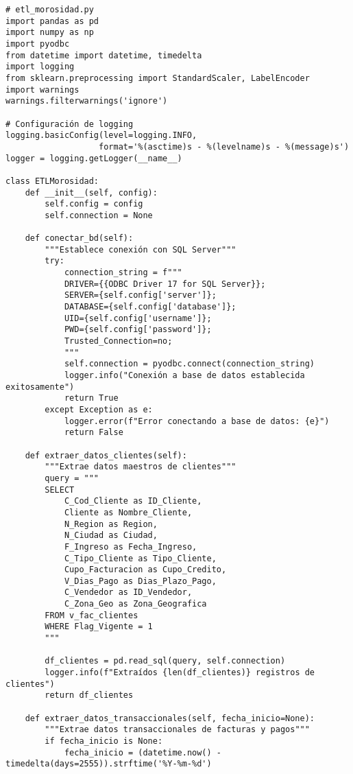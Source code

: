 \begin{verbatim}
# etl_morosidad.py
import pandas as pd
import numpy as np
import pyodbc
from datetime import datetime, timedelta
import logging
from sklearn.preprocessing import StandardScaler, LabelEncoder
import warnings
warnings.filterwarnings('ignore')

# Configuración de logging
logging.basicConfig(level=logging.INFO, 
                   format='%(asctime)s - %(levelname)s - %(message)s')
logger = logging.getLogger(__name__)

class ETLMorosidad:
    def __init__(self, config):
        self.config = config
        self.connection = None
        
    def conectar_bd(self):
        """Establece conexión con SQL Server"""
        try:
            connection_string = f"""
            DRIVER={{ODBC Driver 17 for SQL Server}};
            SERVER={self.config['server']};
            DATABASE={self.config['database']};
            UID={self.config['username']};
            PWD={self.config['password']};
            Trusted_Connection=no;
            """
            self.connection = pyodbc.connect(connection_string)
            logger.info("Conexión a base de datos establecida exitosamente")
            return True
        except Exception as e:
            logger.error(f"Error conectando a base de datos: {e}")
            return False
    
    def extraer_datos_clientes(self):
        """Extrae datos maestros de clientes"""
        query = """
        SELECT 
            C_Cod_Cliente as ID_Cliente,
            Cliente as Nombre_Cliente,
            N_Region as Region,
            N_Ciudad as Ciudad,
            F_Ingreso as Fecha_Ingreso,
            C_Tipo_Cliente as Tipo_Cliente,
            Cupo_Facturacion as Cupo_Credito,
            V_Dias_Pago as Dias_Plazo_Pago,
            C_Vendedor as ID_Vendedor,
            C_Zona_Geo as Zona_Geografica
        FROM v_fac_clientes 
        WHERE Flag_Vigente = 1
        """
        
        df_clientes = pd.read_sql(query, self.connection)
        logger.info(f"Extraídos {len(df_clientes)} registros de clientes")
        return df_clientes
    
    def extraer_datos_transaccionales(self, fecha_inicio=None):
        """Extrae datos transaccionales de facturas y pagos"""
        if fecha_inicio is None:
            fecha_inicio = (datetime.now() - timedelta(days=2555)).strftime('%Y-%m-%d')
        

\end{verbatim}
